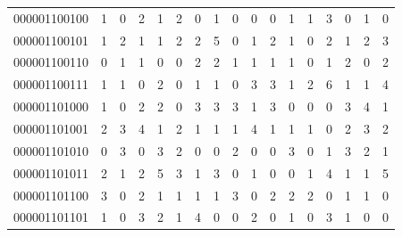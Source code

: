 \documentclass[10pt,a4paper]{article}
\begin{document}
\begin{longtable}{ |c|c|c|c|c|c|c|c|c|c|c|c|c|c|c|c|c| }
    000001100100              & 1                            & 0                                & 2                            & 1                              & 2   & 0   & 1   & 0   & 0   & 0   & 1   & 1   & 3   & 0   & 1   & 0   \\
    000001100101              & 1                            & 2                                & 1                            & 1                              & 2   & 2   & 5   & 0   & 1   & 2   & 1   & 0   & 2   & 1   & 2   & 3   \\
    000001100110              & 0                            & 1                                & 1                            & 0                              & 0   & 2   & 2   & 1   & 1   & 1   & 1   & 0   & 1   & 2   & 0   & 2   \\
    000001100111              & 1                            & 1                                & 0                            & 2                              & 0   & 1   & 1   & 0   & 3   & 3   & 1   & 2   & 6   & 1   & 1   & 4   \\
    000001101000              & 1                            & 0                                & 2                            & 2                              & 0   & 3   & 3   & 3   & 1   & 3   & 0   & 0   & 0   & 3   & 4   & 1   \\
    000001101001              & 2                            & 3                                & 4                            & 1                              & 2   & 1   & 1   & 1   & 4   & 1   & 1   & 1   & 0   & 2   & 3   & 2   \\
    000001101010              & 0                            & 3                                & 0                            & 3                              & 2   & 0   & 0   & 2   & 0   & 0   & 3   & 0   & 1   & 3   & 2   & 1   \\
    000001101011              & 2                            & 1                                & 2                            & 5                              & 3   & 1   & 3   & 0   & 1   & 0   & 0   & 1   & 4   & 1   & 1   & 5   \\
    000001101100              & 3                            & 0                                & 2                            & 1                              & 1   & 1   & 1   & 3   & 0   & 2   & 2   & 2   & 0   & 1   & 1   & 0   \\
    000001101101              & 1                            & 0                                & 3                            & 2                              & 1   & 4   & 0   & 0   & 2   & 0   & 1   & 0   & 3   & 1   & 0   & 0   \\

\end{longtable}
\end{document}
